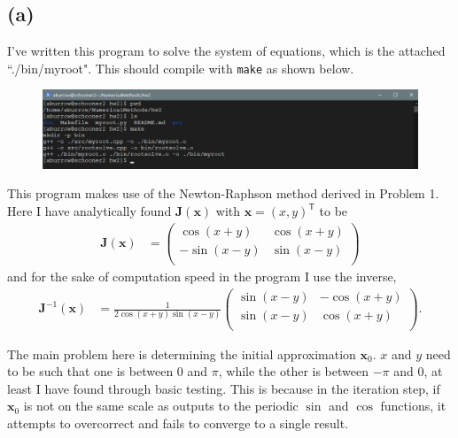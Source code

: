 \documentclass[12pt]{article}
\begin{document}
\subsection*{(a)}

I've written this program to solve the system of equations, which is the
attached ``./bin/myroot". This should compile with \texttt{make} as shown
below.

\begin{figure}[ht]
    \centering
    \includegraphics[width=1.0\textwidth]{compile}
    \label{fig:compile}
\end{figure}

This program makes use of the Newton-Raphson method derived in Problem 1. Here
I have analytically found $\boldsymbol{J}(\boldsymbol{x})$ with
$\boldsymbol{x} = (x, y)^\mathsf{T}$ to be
$$
\begin{aligned}
\boldsymbol{J}(\boldsymbol{x})
&=
\begin{pmatrix}
\cos(x + y) & \cos(x + y) \\
-\sin(x - y) & \sin(x - y) \\
\end{pmatrix}
\end{aligned}
$$
and for the sake of computation speed in the program I use the inverse,
$$
\begin{aligned}
\boldsymbol{J}^{-1}(\boldsymbol{x})
&= \frac{1}{2 \cos(x + y) \sin(x - y)}
\begin{pmatrix}
\sin(x - y) & -\cos(x + y) \\
\sin(x - y) & \cos(x + y) \\
\end{pmatrix}.
\end{aligned}
$$

The main problem here is determining the initial approximation
$\boldsymbol{x}_0$. $x$ and $y$ need to be such that one is between 0 and
$\pi$, while the other is between $-\pi$ and 0, at least I have found through
basic testing. This is because in the iteration step, if $\boldsymbol{x}_0$ is
not on the same scale as outputs to the periodic $\sin$ and $\cos$ functions,
it attempts to overcorrect and fails to converge to a single result.
\end{document}
